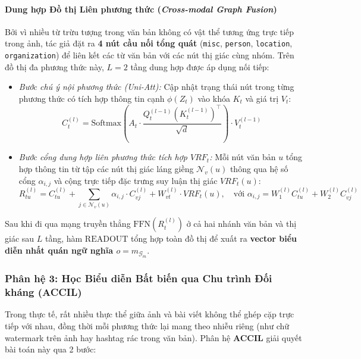 \documentclass[conference,10pt]{IEEEtran}
\begin{document}
\paragraph{Dung hợp Đồ thị Liên phương thức (\textit{Cross-modal Graph Fusion})}
Bởi vì nhiều từ trừu tượng trong văn bản không có vật thể tương ứng trực tiếp trong ảnh, tác giả đặt ra \textbf{4 nút cầu nối tổng quát} (\texttt{misc}, \texttt{person}, \texttt{location}, \texttt{organization}) để liên kết các từ văn bản với các nút thị giác cùng nhóm. Trên đồ thị đa phương thức này, $L = 2$ tầng dung hợp được áp dụng nối tiếp:
\begin{itemize}
    \item \textit{Bước chú ý nội phương thức (Uni-Att):} Cập nhật trạng thái nút trong từng phương thức có tích hợp thông tin cạnh $\phi(Z_t)$ vào khóa $K_t$ và giá trị $V_t$:
    \begin{equation}
        C_t^{(l)} = \text{Softmax}\left( A_t \cdot \frac{Q_t^{(l-1)} \left(K_t^{(l-1)}\right)^\top}{\sqrt{d}} \right) \cdot V_t^{(l-1)}
        \label{eq:cmavrp_uniatt}
    \end{equation}
    \item \textit{Bước cổng dung hợp liên phương thức tích hợp $VRF_t$:} Mỗi nút văn bản $u$ tổng hợp thông tin từ tập các nút thị giác láng giềng $\mathcal{N}_v(u)$ thông qua hệ số cổng $\alpha_{i,j}$ và cộng trực tiếp đặc trưng suy luận thị giác $VRF_t(u)$:
    \begin{equation}
        R_{tu}^{(l)} = C_{tu}^{(l)} + \sum_{j \in \mathcal{N}_v(u)} \alpha_{i,j} \cdot C_{vj}^{(l)} + W_{vt}^{(l)} \cdot VRF_t(u), \quad \text{với } \alpha_{i,j} = W_1^{(l)} C_{tu}^{(l)} + W_2^{(l)} C_{vj}^{(l)}
        \label{eq:cmavrp_gate}
    \end{equation}
\end{itemize}
Sau khi đi qua mạng truyền thẳng $\text{FFN}(R_t^{(l)})$ ở cả hai nhánh văn bản và thị giác sau $L$ tầng, hàm $\text{READOUT}$ tổng hợp toàn đồ thị để xuất ra \textbf{vector biểu diễn nhất quán ngữ nghĩa $o = m_{\mathcal{G}_m}$}.

\subsubsection{Phân hệ 3: Học Biểu diễn Bất biến qua Chu trình Đối kháng (ACCIL)}

Trong thực tế, rất nhiều thực thể giữa ảnh và bài viết không thể ghép cặp trực tiếp với nhau, đồng thời mỗi phương thức lại mang theo nhiễu riêng (như chữ watermark trên ảnh hay hashtag rác trong văn bản). Phân hệ \textbf{ACCIL} giải quyết bài toán này qua 2 bước:
\end{document}
